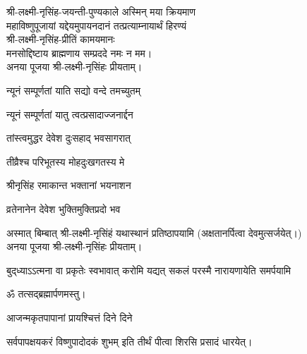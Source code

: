 \begin{center}
\hiranyagarbha

श्री-लक्ष्मी-नृसिंह-जयन्ती-पुण्यकाले अस्मिन् मया क्रियमाण\\
महाविष्णुपूजायां यद्देयमुपायनदानं तत्प्रत्याम्नायार्थं हिरण्यं\\
श्री-लक्ष्मी-नृसिंह-प्रीतिं कामयमानः\\
मनसोद्दिष्टाय ब्राह्मणाय सम्प्रददे नमः न मम।\\
अनया पूजया श्री-लक्ष्मी-नृसिंहः प्रीयताम्।


{न्यूनं सम्पूर्णतां याति सद्यो वन्दे तमच्युतम्}

{न्यूनं सम्पूर्णतां यातु त्वत्प्रसादाज्जनार्द्दन}

{तांस्त्वमुद्धर देवेश दुःसहाद् भवसागरात्}

{तीव्रैश्च परिभूतस्य मोहदुःखगतस्य मे}

{श्रीनृसिंह रमाकान्त भक्तानां भयनाशन}

{व्रतेनानेन देवेश भुक्तिमुक्तिप्रदो भव}

\medskip

अस्मात् बिम्बात् श्री-लक्ष्मी-नृसिंहं यथास्थानं प्रतिष्ठापयामि (अक्षतानर्पित्वा देवमुत्सर्जयेत्।)\\
अनया पूजया श्री-लक्ष्मी-नृसिंहः प्रीयताम्।\medskip

{बुद्‌ध्याऽऽत्मना वा प्रकृतेः स्वभावात्}
{करोमि यद्यत् सकलं परस्मै}
{नारायणायेति समर्पयामि}

ॐ तत्सद्ब्रह्मार्पणमस्तु।\medskip

{आजन्मकृतपापानां प्रायश्चित्तं दिने दिने}

{सर्वपापक्षयकरं विष्णुपादोदकं शुभम्}
इति तीर्थं पीत्वा शिरसि प्रसादं धारयेत्।

\end{center}

\closesub

\begin{center}
\end{center}

\closesection
